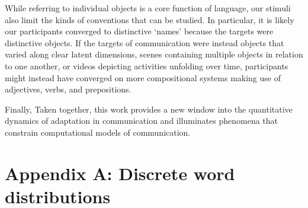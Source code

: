 \documentclass[alpha-refs]{wiley-article}
\begin{document}
While referring to individual objects is a core function of language, our stimuli also limit the kinds of conventions that can be studied. 
In particular, it is likely our participants converged to distinctive `names' because the targets were distinctive objects.
If the targets of communication were instead objects that varied along clear latent dimensions, scenes containing multiple objects in relation to one another, or videos depicting activities unfolding over time, participants might instead have converged on more compositional systems making use of adjectives, verbs, and prepositions.

Finally, 
Taken together, this work provides a new window into the quantitative dynamics of adaptation in communication and illuminates phenomena that constrain computational models of communication. 
%

\printendnotes



\section*{Appendix A: Discrete word distributions}
\end{document}
